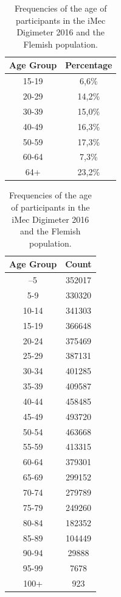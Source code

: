 \begin{table}
  \caption{Frequencies of the age of participants in the iMec Digimeter 2016 and the Flemish population.}
  \label{tab:frequenties-leeftijden}
  \centering
  \begin{tabular}{cc}
    \textbf{Age Group} & \textbf{Percentage} \\ \midrule
    15-19 & 6,6\% \\
    20-29 & 14,2\% \\
    30-39 & 15,0\% \\
    40-49 & 16,3\% \\
    50-59 & 17,3\% \\
    60-64 & 7,3\% \\
    64+   & 23,2\% \\
  \end{tabular}
  \label{tab:digimeter2016}
  
  \centering
  \begin{tabular}{cc}
    \textbf{Age Group} & \textbf{Count} \\ \midrule
    –5            &     352017      \\
    5-9           &     330320      \\
    10-14          &     341303      \\
    15-19          &     366648      \\
    20-24          &     375469      \\
    25-29          &     387131      \\
    30-34          &     401285      \\
    35-39          &     409587      \\
    40-44          &     458485      \\
    45-49          &     493720      \\
    50-54          &     463668      \\
    55-59          &     413315      \\
    60-64          &     379301      \\
    65-69          &     299152      \\
    70-74          &     279789      \\
    75-79          &     249260      \\
    80-84          &     182352      \\
    85-89          &     104449      \\
    90-94          &      29888      \\
    95-99          &      7678       \\
    100+           &       923
  \end{tabular}
  \label{tab:age-Flanders}
    
\end{table}

